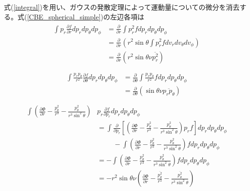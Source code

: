 式(\ref{integral})を用い、ガウスの発散定理によって運動量についての微分を消去する。式(\ref{CBE_spherical_simple})の左辺各項は
\begin{align}
\begin{aligned}
	\int p_r\frac{\partial f}{\partial r}dp_r dp_{\theta} dp_{\phi} &= \frac{\partial}{\partial r} \int p_r^2 f dp_r dp_{\theta} dp_{\phi} \\
	&= \frac{\partial}{\partial r} \left(r^2\sin\theta \int p_r^2f dv_r dv_{\theta} dv_{\phi} \right) \\
	&= \frac{\partial}{\partial r} \left(r^2\sin\theta \nu \overline{p_r^2} \right) \\
\end{aligned}
\end{align}
\begin{align}
\begin{aligned}
	\int \frac{p_r p_{\theta}}{r^2} \frac{\partial f}{\partial \theta} dp_r dp_{\theta} dp_{\phi} &= \frac{\partial}{\partial \theta} \int \frac{p_r p_{\theta}}{r^2} f dp_r dp_{\theta} dp_{\phi} \\
	&= \frac{\partial}{\partial \theta}(\sin\theta \nu \overline{p_r p_{\theta}}) \\
\end{aligned}
\end{align}
\begin{align}
\begin{aligned}
	\int \left(\frac{\partial \Phi}{\partial r} - \frac{p_{\theta}^2}{r^3} - \frac{p_{\theta}^2}{r^3 \sin^2\theta} \right) & p_r \frac{\partial f}{\partial p_r}dp_r dp_{\theta} dp_{\phi} \\
	&= \int \frac{\partial}{\partial p_r} \left[ \left(\frac{\partial \Phi}{\partial r} - \frac{p_{\theta}^2}{r^3} - \frac{p_{\theta}^2}{r^3 \sin^2\theta} \right) p_r f\right] dp_r dp_{\theta} dp_{\phi} \\
	& \hspace{1cm }- \int \left(\frac{\partial \Phi}{\partial r} - \frac{p_{\theta}^2}{r^3} - \frac{p_{\theta}^2}{r^3 \sin^2\theta} \right) f dp_r dp_{\theta} dp_{\phi} \\
	&= - \int \left(\frac{\partial \Phi}{\partial r} - \frac{p_{\theta}^2}{r^3} - \frac{p_{\theta}^2}{r^3 \sin^2\theta} \right) f dp_r dp_{\theta} dp_{\phi} \\
	&= - r^2\sin\theta \nu \left(\frac{\partial \Phi}{\partial r} - \frac{\overline{p_{\theta}^2}}{r^3} - \frac{\overline{p_{\theta}^2}}{r^3 \sin^2\theta} \right) \\
\end{aligned}
\end{align}
